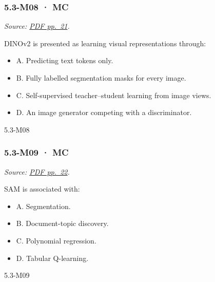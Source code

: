\noindent\begin{minipage}{\linewidth}

\subsubsection{5.3-M08 · MC}\label{m08-mc-14}

\emph{Source:
\href{../Lecture\%20Slides/5.3.\%20Foundation\%20models.pdf\#page=21}{PDF
pp.~21}.}

DINOv2 is presented as learning visual representations through:

\begin{itemize}
\tightlist
\item
  A. Predicting text tokens only.
\item
  B. Fully labelled segmentation masks for every image.
\item
  C. Self-supervised teacher--student learning from image views.
\item
  D. An image generator competing with a discriminator.
\end{itemize}

\begin{solution}[8mm]{5.3-M08}

\end{solution}
\end{minipage}\par\medskip

\noindent\begin{minipage}{\linewidth}

\subsubsection{5.3-M09 · MC}\label{m09-mc-14}

\emph{Source:
\href{../Lecture\%20Slides/5.3.\%20Foundation\%20models.pdf\#page=22}{PDF
pp.~22}.}

SAM is associated with:

\begin{itemize}
\tightlist
\item
  A. Segmentation.
\item
  B. Document-topic discovery.
\item
  C. Polynomial regression.
\item
  D. Tabular Q-learning.
\end{itemize}

\begin{solution}[8mm]{5.3-M09}

\end{solution}
\end{minipage}\par\medskip

